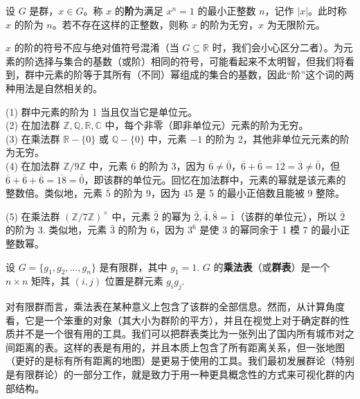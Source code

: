 \begin{definition}
设 \(G\) 是群，\(x \in G\)。称 \(x\) 的\textbf{阶}为满足 \(x^n = 1\) 的最小正整数 \(n\)，记作 \(|x|\)。此时称 \(x\) 的阶为 \(n\)。若不存在这样的正整数，则称 \(x\) 的阶为无穷，\(x\) 为无限阶元。
\end{definition}

\( x \) 的阶的符号不应与绝对值符号混淆（当 \( G \subseteq \mathbb{R} \) 时，我们会小心区分二者）。为元素的阶选择与集合的基数（或阶）相同的符号，可能看起来不太明智，但我们将看到，群中元素的阶等于其所有（不同）幂组成的集合的基数，因此“阶”这个词的两种用法是自然相关的。

\begin{example}
(1) 群中元素的阶为 1 当且仅当它是单位元。\\
(2) 在加法群 \(\mathbb{Z}, \mathbb{Q}, \mathbb{R}, \mathbb{C}\) 中，每个非零（即非单位元）元素的阶为无穷。\\
(3) 在乘法群 \(\mathbb{R} - \{0\}\) 或 \(\mathbb{Q} - \{0\}\) 中，元素 \(-1\) 的阶为 2，其他非单位元元素的阶为无穷。\\
(4) 在加法群 \(\mathbb{Z}/9\mathbb{Z}\) 中，元素 \(\overline{6}\) 的阶为 3，因为 \(\overline{6} \neq \bar{0}\)，\(\overline{6} + \overline{6} = \overline{12} = \overline{3} \neq \bar{0}\)，但 \(\overline{6} + \overline{6} + \overline{6} = \overline{18} = \bar{0}\)，即该群的单位元。回忆在加法群中，元素的幂就是该元素的整数倍。类似地，元素 \(\overline{5}\) 的阶为 9，因为 45 是 5 的最小正倍数且能被 9 整除。

(5) 在乘法群 \((\mathbb{Z}/7\mathbb{Z})^\times\) 中，元素 \(\bar{2}\) 的幂为 \(\bar{2}, \bar{4}, \bar{8} = \bar{1}\)（该群的单位元），所以 \(\bar{2}\) 的阶为 3. 类似地，元素 \(\bar{3}\) 的阶为 6，因为 \(3^6\) 是使 3 的幂同余于 1 模 7 的最小正整数幂。
\end{example}

\begin{definition}
设 \(G = \{g_1, g_2, \ldots, g_n\}\) 是有限群，其中 \(g_1 = 1\). \(G\) 的\textbf{乘法表}（或\textbf{群表}）是一个 \(n \times n\) 矩阵，其 \((i, j)\) 位置是群元素 \(g_i g_j\).
\end{definition}

对有限群而言，乘法表在某种意义上包含了该群的全部信息。然而，从计算角度看，它是一个笨重的对象（其大小为群阶的平方），并且在视觉上对于确定群的性质并不是一个很有用的工具。我们可以把群表类比为一张列出了国内所有城市对之间距离的表。这样的表是有用的，并且本质上包含了所有距离关系，但一张地图（更好的是标有所有距离的地图）是更易于使用的工具。我们最初发展群论（特别是有限群论）的一部分工作，就是致力于用一种更具概念性的方式来可视化群的内部结构。

